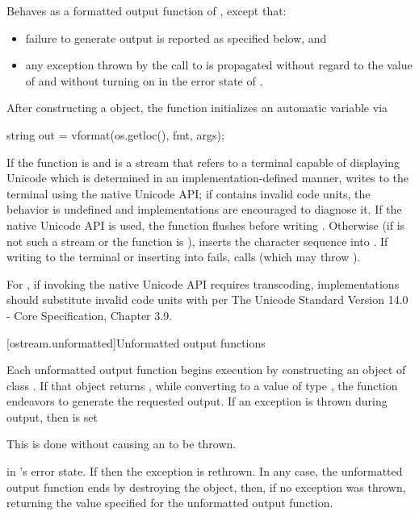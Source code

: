 \begin{itemdescr}
\pnum
\effects
Behaves as a formatted output function
of , except that:
\begin{itemize}
\item
failure to generate output is reported as specified below, and
\item
any exception thrown by the call to  is propagated
without regard to the value of  and
without turning on  in the error state of .
\end{itemize}
After constructing a  object,
the function initializes an automatic variable via
\begin{codeblock}
string out = vformat(os.getloc(), fmt, args);
\end{codeblock}
If the function is  and
 is a stream that refers to a terminal capable of displaying Unicode
which is determined in an implementation-defined manner,
writes  to the terminal using the native Unicode API;
if  contains invalid code units,
%
the behavior is undefined and
implementations are encouraged to diagnose it.
If the native Unicode API is used,
the function flushes  before writing .
Otherwise (if  is not such a stream or
the function is ),
inserts the character sequence
 into .
If writing to the terminal or inserting into  fails,
calls 
(which may throw ).

\pnum
\recommended
For ,
if invoking the native Unicode API requires transcoding,
implementations should substitute invalid code units
with  per
The Unicode Standard Version 14.0 - Core Specification, Chapter 3.9.
\end{itemdescr}

[ostream.unformatted]{Unformatted output functions}

\pnum
Each
unformatted
output function begins execution by constructing an object of class
.
If that object returns
,
while converting to a value of type
,
the function endeavors
to generate the requested output.
If an exception is thrown during output, then
is set
\begin{footnote}
This is done without causing an
to be thrown.
\end{footnote}
in
's
error state.
If
then the exception is rethrown.
In any case, the unformatted output function ends by destroying the
 object, then, if no exception was thrown, returning the value
specified for the unformatted output function.

